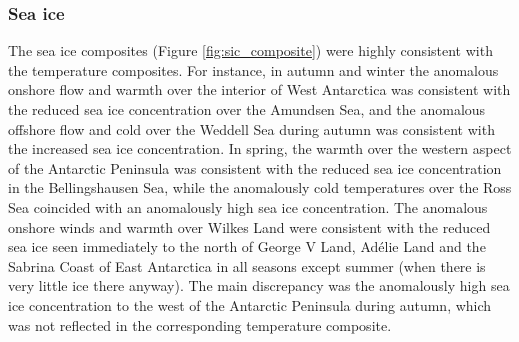 \subsubsection{Sea ice}

The sea ice composites (Figure \ref{fig:sic_composite}) were highly consistent with the temperature composites. For instance, in autumn and winter the anomalous onshore flow and warmth over the interior of West Antarctica was consistent with the reduced sea ice concentration over the Amundsen Sea, and the anomalous offshore flow and cold over the Weddell Sea during autumn was consistent with the increased sea ice concentration. In spring, the warmth over the western aspect of the Antarctic Peninsula was consistent with the reduced sea ice concentration in the Bellingshausen Sea, while the anomalously cold temperatures over the Ross Sea coincided with an anomalously high sea ice concentration. The anomalous onshore winds and warmth over Wilkes Land were consistent with the reduced sea ice seen immediately to the north of George V Land, Ad{\'e}lie Land and the Sabrina Coast of East Antarctica in all seasons except summer (when there is very little ice there anyway). The main discrepancy was the anomalously high sea ice concentration to the west of the Antarctic Peninsula during autumn, which was not reflected in the corresponding temperature composite.